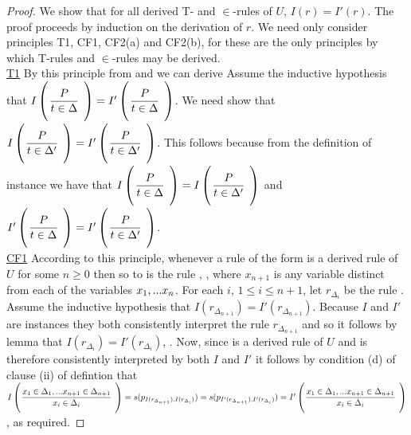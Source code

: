 \begin{proof}
We show that for all derived  T- and $\in$-rules of $U$, $I(r)=I'(r)$.  
The proof proceeds by induction on the derivation of $r$. 
We need only consider principles T1, CF1, CF2(a) and CF2(b), for these are the only principles by which  T-rules and $\in$-rules may be derived.\\
\underline{T1}
By this principle from  and  we can derive 
Assume the inductive hypothesis that $\Imap{\gatdisplayrule{P}{\ofT{t}{\Delta}}} = \Ipmap{\gatdisplayrule{P}{\ofT{t}{\Delta}}}$.
We need show that $\Imap{\gatdisplayrule{P}{\ofT{t}{\Delta'}}} = \Ipmap{\gatdisplayrule{P}{\ofT{t}{\Delta'}}}$.
This follows because from the definition of instance we have that $\Imap{\gatdisplayrule{P}{\ofT{t}{\Delta}}} = \Imap{\gatdisplayrule{P}{\ofT{t}{\Delta'}}}$
and $\Ipmap{\gatdisplayrule{P}{\ofT{t}{\Delta}}} = \Ipmap{\gatdisplayrule{P}{\ofT{t}{\Delta'}}}$.
\\

\underline{CF1} According to this principle, 
whenever a rule of the form  is a derived rule of $U$ for some $n \geq 0$
then so to is the rule , \foreachi[n+1], where $x_{n+1}$ is any variable distinct from each of the variables $x_1,...x_n$. For each $i$, $1 \leq i \leq n+1$, let $r_{\Delta_i}$ be the rule . Assume the inductive hypothesis that
$I(r_{\Delta_{n+1}})=I'(r_{\Delta_{n+1}})$. Because $I$ and $I'$ are instances they both consistently interpret the rule $r_{\Delta_{n+1}}$
and so it follows by lemma  that
$I(r_{\Delta_i})=I'(r_{\Delta_i})$, \foreachi. Now, since  is a derived rule
of $U$ and is therefore consistently interpreted by both $I$ and $I'$
it follows by condition (d) of clause (ii) of defintion  that
$
\Imap{\gatdisplayrule{\xDelta{n+1}}{\ofT{x_i}{\Delta_{i}}}}
=s(p_{I(r_{\Delta_{n+1}}),I(r_{\Delta_{i}})})
=s(p_{I'(r_{\Delta_{n+1}}),I'(r_{\Delta_{i}})})
=\Ipmap{\gatdisplayrule{\xDelta{n+1}}{\ofT{x_i}{\Delta_{i}}}}
$, as required.


\end{proof}
